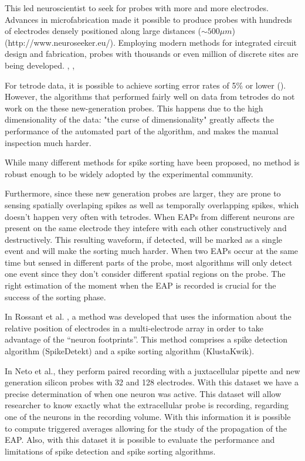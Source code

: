 This led neuroscientist to seek for probes with more and more electrodes. Advances in microfabrication made it possible to produce probes with hundreds of electrodes densely positioned along large distances ($\sim 500 \mu m$) (http://www.neuroseeker.eu/). Employing modern methods for integrated circuit design and fabrication, probes with thousands or even million of discrete sites are being developed. \cite{dombovari2014vivo}, \cite{ruther2015new}, \cite{shobe2015brain}

For tetrode data, it is possible to achieve sorting error rates of 5\% or lower (\cite{harris2000accuracy}). However, the algorithms that performed fairly well on data from tetrodes do not work on the these new-generation probes. This happens due to the high dimensionality of the data: "the curse of dimensionality" greatly affects the performance of the automated part of the algorithm, and makes the manual inspection much harder.

While many different methods for spike sorting have been proposed, no method is robust enough to be widely adopted by the experimental community.

Furthermore, since these new generation probes are larger, they are prone to sensing spatially overlaping spikes as well as temporally overlapping spikes, which doesn't happen very often with tetrodes. When EAPs from different neurons are present on the same electrode they intefere with each other constructively and destructively. This resulting waveform, if detected, will be marked as a single event and will make the sorting much harder. When two EAPs occur at the same time but sensed in different parts of the probe, most algorithms will only detect one event since they don't consider different spatial regions on the probe. The right estimation of the moment when the EAP is recorded is crucial for the success of the sorting phase. 

In Rossant et al. \cite{Rossant2016}, a method was developed that uses the information about the relative position of electrodes in a multi-electrode array in order to take advantage of the “neuron footprints”. This method comprises a spike detection algorithm (SpikeDetekt) and a spike sorting algorithm (KlustaKwik).

In Neto et al., they perform paired recording with a juxtacellular pipette and new generation silicon probes with 32 and 128 electrodes. With this dataset we have a precise determination of when one neuron was active. This dataset will allow researcher to know exactly what the extracellular probe is recording, regarding one of the neurons in the recording volume. With this information it is possible to compute triggered averages allowing for the study of the propagation of the EAP. Also, with this dataset it is possible to evaluate the performance and limitations of spike detection and spike sorting algorithms.

